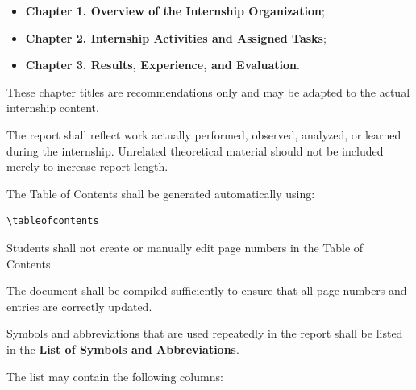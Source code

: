 {\begin{itemize}[leftmargin=0.8cm, itemsep=2pt]
    \item \textbf{Chapter 1. Overview of the Internship Organization};
    \item \textbf{Chapter 2. Internship Activities and Assigned Tasks};
    \item \textbf{Chapter 3. Results, Experience, and Evaluation}.
\end{itemize}

These chapter titles are recommendations only and may be adapted to the
actual internship content.

The report shall reflect work actually performed, observed, analyzed, or
learned during the internship. Unrelated theoretical material should not
be included merely to increase report length.

\vspace{0.3cm}


\noindent
{}

\vspace{0.15cm}

The Table of Contents shall be generated automatically using:

\begin{verbatim}
\tableofcontents
\end{verbatim}

Students shall not create or manually edit page numbers in the Table of
Contents.

The document shall be compiled sufficiently to ensure that all page
numbers and entries are correctly updated.

\vspace{0.3cm}


\noindent
{}

\vspace{0.15cm}

Symbols and abbreviations that are used repeatedly in the report shall be
listed in the \textbf{List of Symbols and Abbreviations}.

The list may contain the following columns:

}
